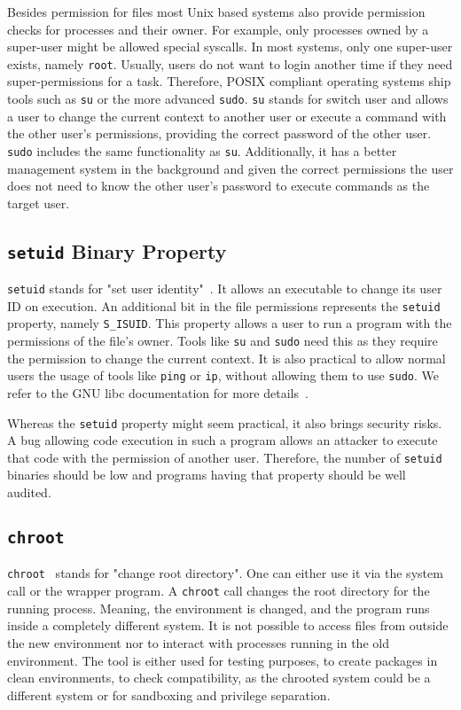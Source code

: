 Besides permission for files most Unix based systems also provide permission
checks for processes and their owner. For example, only processes owned by a
super-user might be allowed special syscalls. In most systems, only one
super-user exists, namely \texttt{root}. Usually, users do not want to login
another time if they need super-permissions for a task. Therefore, POSIX
compliant operating systems ship tools such as \texttt{su} or the more advanced
\texttt{sudo}. \texttt{su} stands for switch user and allows a user to change
the current context to another user or execute a command with the other user's
permissions, providing the correct password of the other user. \texttt{sudo}
includes the same functionality as \texttt{su}. Additionally, it has a better
management system in the background and given the correct permissions the user
does not need to know the other user's password to execute commands as the
target user.

\subsection{\texttt{setuid} Binary Property}

\texttt{setuid} stands for "set user identity"~\cite{ogroupsetuid}. It allows an
executable to change its user ID on execution. An additional bit in the file
permissions represents the \texttt{setuid} property, namely \texttt{S\_ISUID}.
This property allows a user to run a program with the permissions of the file's
owner. Tools like \texttt{su} and \texttt{sudo} need this as they require the
permission to change the current context. It is also practical to allow normal
users the usage of tools like \texttt{ping} or \texttt{ip}, without allowing
them to use \texttt{sudo}. We refer to the GNU libc documentation for more
details~\cite{libcpermission}.

Whereas the \texttt{setuid} property might seem practical, it also brings
security risks. A bug allowing code execution in such a program allows an
attacker to execute that code with the permission of another user. Therefore,
the number of \texttt{setuid} binaries should be low and programs having that
property should be well audited.

\subsection{\texttt{chroot}}

\texttt{chroot}~\cite{ogroupchroot} stands for "change root directory". One can
either use it via the system call or the wrapper program. A \texttt{chroot} call
changes the root directory for the running process. Meaning, the environment is
changed, and the program runs inside a completely different system. It is not
possible to access files from outside the new environment nor to interact with
processes running in the old environment. The tool is either used for testing
purposes, to create packages in clean environments, to check compatibility, as
the chrooted system could be a different system or for sandboxing and privilege
separation.

